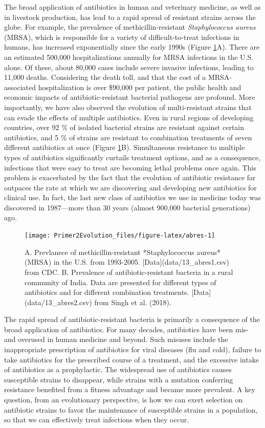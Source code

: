 \documentclass[
]{book}
\begin{document}
The broad application of antibiotics in human and veterinary medicine, as well as in livestock production, has lead to a rapid spread of resistant strains across the globe. For example, the prevalence of methicillin-resistant \emph{Staphylococcus aureus} (MRSA), which is responsible for a variety of difficult-to-treat infections in humans, has increased exponentially since the early 1990s (Figure \ref{fig:abres}A). There are an estimated 500,000 hospitalizations annually for MRSA infections in the U.S. alone. Of these, about 80,000 cases include severe invasive infections, leading to 11,000 deaths. Considering the death toll, and that the cost of a MRSA-associated hospitalization is over \$90,000 per patient, the public health and economic impacts of antibiotic-resistant bacterial pathogens are profound. More importantly, we have also observed the evolution of multi-resistant strains that can evade the effects of multiple antibiotics. Even in rural regions of developing countries, over 92 \% of isolated bacterial strains are resistant against certain antibiotics, and 5 \% of strains are resistant to combination treatments of seven different antibiotics at once (Figure \ref{fig:abres}B). Simultaneous resistance to multiple types of antibiotics significantly curtails treatment options, and as a consequence, infections that were easy to treat are becoming lethal problems once again. This problem is exacerbated by the fact that the evolution of antibiotic resistance far outpaces the rate at which we are discovering and developing new antibiotics for clinical use. In fact, the last new class of antibiotics we use in medicine today was discovered in 1987---more than 30 years (almost 900,000 bacterial generations) ago.

\begin{figure}
\texttt{[image: Primer2Evolution\_files/figure-latex/abres-1]} \caption{A. Prevlanece of methicillin-resistant *Staphylococcus aureus* (MRSA) in the U.S. from 1993-2005. [Data](data/13_abres1.csv) from CDC. B. Prevalence of antibiotic-resistant bacteria in a rural community of India. Data are presented for different types of antibiotics and for different combination treatments. [Data](data/13_abres2.csv) from Singh et al. (2018).}\label{fig:abres}
\end{figure}

The rapid spread of antibiotic-resistant bacteria is primarily a consequence of the broad application of antibiotics. For many decades, antibiotics have been mis- and overused in human medicine and beyond. Such misuses include the inappropriate prescription of antibiotics for viral diseases (flu and cold), failure to take antibiotics for the prescribed course of a treatment, and the excessive intake of antibiotics as a prophylactic. The widespread use of antibiotics causes susceptible strains to disappear, while strains with a mutation conferring resistance benefited from a fitness advantage and became more prevalent. A key question, from an evolutionary perspective, is how we can exert selection on antibiotic strains to favor the maintenance of susceptible strains in a population, so that we can effectively treat infections when they occur.
\end{document}
